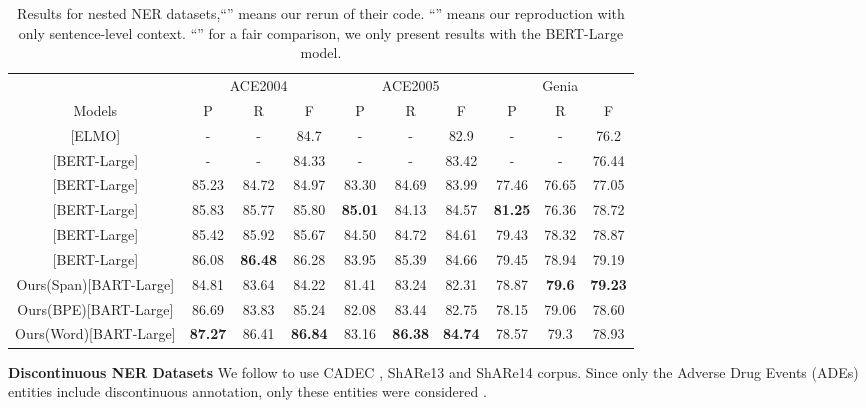 \documentclass[11pt,a4paper]{article}
\begin{document}
\begin{table*}[ht]
  \centering
  \setlength{\tabcolsep}{2pt}
  \begin{tabular}{c|ccc|ccc|ccc}
\toprule
    & \multicolumn{3}{c|}{ACE2004} & \multicolumn{3}{c|}{ACE2005} & \multicolumn{3}{c}{Genia} \\
   Models & P       & R       & F       & P       & R       & F       & P       & R      & F      \\
\midrule
  \citet{DBLP:conf/naacl/LuanWHSOH19}[ELMO]       & -       & -       & 84.7    & -       & -       & 82.9    & -       & -      & 76.2   \\
  \citet{DBLP:conf/acl/StrakovaSH19}[BERT-Large] & -       & -       & 84.33   & -       & -       & 83.42   & -       & -      & 76.44  \\
  \citet{DBLP:journals/tacl/ShibuyaH20}[BERT-Large] & 85.23 &  84.72 & 84.97      & 83.30   & 84.69   & 83.99   & 77.46   & 76.65  & 77.05  \\
  \citet{DBLP:conf/acl/LiFMHWL20}[BERT-Large] & 85.83   & 85.77   &  85.80  & \textbf{85.01}   & 84.13   & 84.57   & \textbf{81.25}   & 76.36  &  78.72 \\
  \citet{DBLP:conf/acl/YuBP20}[BERT-Large]   & 85.42   & 85.92   & 85.67   & 84.50   & 84.72   & 84.61   & 79.43   & 78.32  & 78.87  \\
  \citet{DBLP:conf/acl/WangSCC20}[BERT-Large]     & 86.08   & \textbf{86.48}   & 86.28   & 83.95   & 85.39   & 84.66   & 79.45   & 78.94  & 79.19  \\
\midrule
  Ours(Span)[BART-Large]                          & 84.81   & 83.64   & 84.22   & 81.41   & 83.24   & 82.31   & 78.87   & \textbf{79.6}   & \textbf{79.23}  \\
  Ours(BPE)[BART-Large] & 86.69   & 83.83   & 85.24   & 82.08   & 83.44   & 82.75   & 78.15   & 79.06  & 78.60  \\
  Ours(Word)[BART-Large] & \textbf{87.27}   & 86.41   & \textbf{86.84}   & 83.16   & \textbf{86.38}   & \textbf{84.74}   & 78.57   & 79.3   & 78.93  \\
\bottomrule
  \end{tabular}
  \caption{Results for nested NER datasets,``'' means our rerun of their code. ``'' means our reproduction with only sentence-level context. ``'' for a fair comparison, we only present results with the BERT-Large model.}
  \label{tb:nested_ner}
\end{table*}


\textbf{Discontinuous NER Datasets} We follow \citet{DBLP:conf/acl/DaiKHP20} to use CADEC \citep{DBLP:journals/jbi/KarimiMKW15}, ShARe13 \citep{DBLP:conf/clef/PradhanESMCVSCS13} and ShARe14 \citep{DBLP:conf/clef/MoweryVSCMKGEPSC14} corpus. Since only the Adverse Drug Events (ADEs) entities include discontinuous annotation, only these entities were considered \citep{DBLP:conf/acl/DaiKHP20,DBLP:conf/semweb/Metke-JimenezK16,DBLP:journals/wicomm/TangHWC18}.
\end{document}
